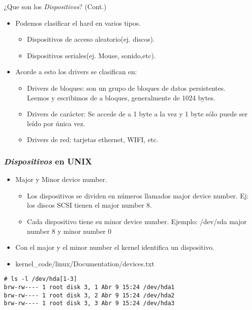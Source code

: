 \begin{frame}{¿Que son los \textit{Dispositivos}? (Cont.)}
  \begin{itemize}
	\item Podemos clasificar el hard en varios tipos.
	\begin{itemize}
		\item Dispositivos de acceso aleatorio(ej. discos). 
		\item Dispositivos seriales(ej. Mouse, sonido,etc).
	\end{itemize}	
	\item Acorde a esto los drivers se clasifican en:
     	\begin{itemize}
		\item Drivers de bloques: son un grupo de bloques de datos persistentes. Leemos y escribimos de a bloques, generalmente de 			1024 bytes. 
		\item Drivers de carácter: Se accede de a 1 byte a la vez y 1 byte sólo puede ser leído por única vez.
		\item Drivers de red: tarjetas ethernet, WIFI, etc.
	\end{itemize}	
  \end{itemize}
\end{frame}

\begin{frame}[fragile]
\frametitle{\textit{Dispositivos} en UNIX}  
  \begin{itemize}
	\item Major y Minor device number.
	\begin{itemize}
		\item Los dispositivos se dividen en números llamados major device number. Ej: los discos SCSI tienen el major number 8.
		\item Cada dispositivo tiene su minor device number. Ejemplo: /dev/sda major number 8 y minor number 0 
	\end{itemize}	
	\item Con el major y el minor number el kernel identifica un dispositivo.
	\item kernel\_code/linux/Documentation/devices.txt
  \end{itemize}
\begin{lstlisting}
# ls -l /dev/hda[1-3]
brw-rw---- 1 root disk 3, 1 Abr 9 15:24 /dev/hda1
brw-rw---- 1 root disk 3, 2 Abr 9 15:24 /dev/hda2
brw-rw---- 1 root disk 3, 3 Abr 9 15:24 /dev/hda3
\end{lstlisting}
\end{frame}


